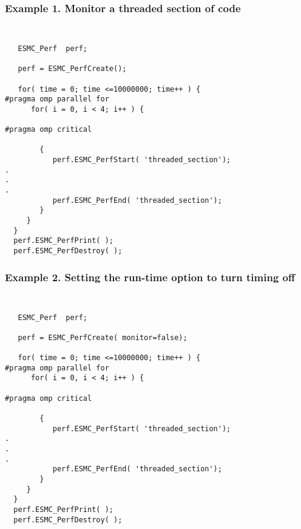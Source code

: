 %



\subsubsection{Example 1. Monitor a threaded section of code}
{\tt
\begin{verbatim}
   ESMC_Perf  perf;

   perf = ESMC_PerfCreate();

   for( time = 0; time <=10000000; time++ ) {
#pragma omp parallel for
      for( i = 0, i < 4; i++ ) {

#pragma omp critical

        {
           perf.ESMC_PerfStart( 'threaded_section');
.
.
.
           perf.ESMC_PerfEnd( 'threaded_section');
        }
     }
  }
  perf.ESMC_PerfPrint( );
  perf.ESMC_PerfDestroy( );
\end{verbatim}
}
\subsubsection{Example 2. Setting the run-time option to turn timing off}
{\tt
\begin{verbatim}
   ESMC_Perf  perf;

   perf = ESMC_PerfCreate( monitor=false);

   for( time = 0; time <=10000000; time++ ) {
#pragma omp parallel for
      for( i = 0, i < 4; i++ ) {

#pragma omp critical

        {
           perf.ESMC_PerfStart( 'threaded_section');
.
.
.
           perf.ESMC_PerfEnd( 'threaded_section');
        }
     }
  }
  perf.ESMC_PerfPrint( );
  perf.ESMC_PerfDestroy( );
\end{verbatim}
}

